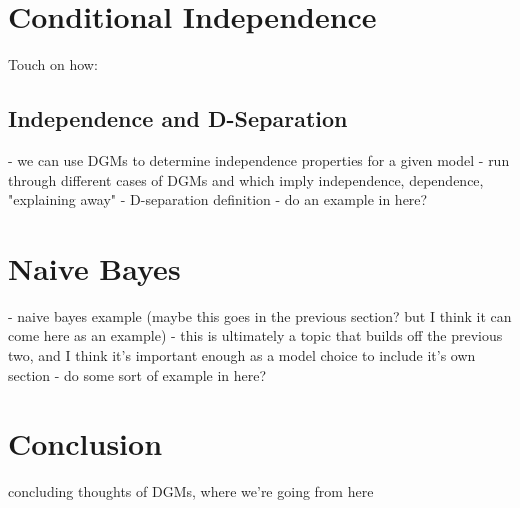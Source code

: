 \section{Conditional Independence}
Touch on how:

\subsection{Independence and D-Separation}
- we can use DGMs to determine independence properties for a given model
- run through different cases of DGMs and which imply independence, dependence, "explaining away"
- D-separation definition
- do an example in here?

\section{Naive Bayes}
- naive bayes example (maybe this goes in the previous section? but I think it can come here as an example)
- this is ultimately a topic that builds off the previous two, and I think it's important enough as a model choice to include it's own section
- do some sort of example in here?

\section{Conclusion}
concluding thoughts of DGMs, where we're going from here


